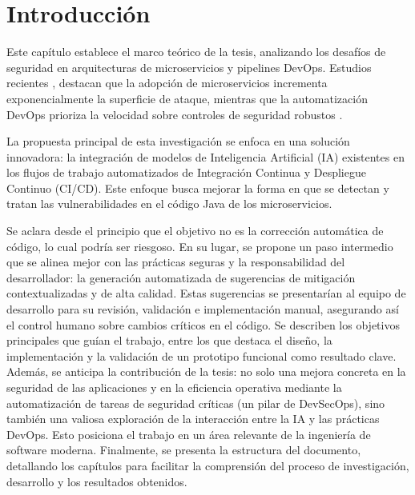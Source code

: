 \chapter{Introducción}\label{chap:introduccion}
Este capítulo establece el marco teórico de la tesis, analizando los desafíos de seguridad en arquitecturas de microservicios y pipelines DevOps. Estudios recientes \cite{1}, \cite{2} destacan que la adopción de microservicios incrementa exponencialmente la superficie de ataque, mientras que la automatización DevOps prioriza la velocidad sobre controles de seguridad robustos \cite{3}.

La propuesta principal de esta investigación se enfoca en una solución innovadora: la integración de modelos de Inteligencia Artificial (IA) existentes en los flujos de trabajo automatizados de Integración Continua y Despliegue Continuo (CI/CD). Este enfoque busca mejorar la forma en que se detectan y tratan las vulnerabilidades en el código Java de los microservicios.

Se aclara desde el principio que el objetivo no es la corrección automática de código, lo cual podría ser riesgoso. En su lugar, se propone un paso intermedio que se alinea mejor con las prácticas seguras y la responsabilidad del desarrollador: la generación automatizada de sugerencias de mitigación contextualizadas y de alta calidad. Estas sugerencias se presentarían al equipo de desarrollo para su revisión, validación e implementación manual, asegurando así el control humano sobre cambios críticos en el código. Se describen los objetivos principales que guían el trabajo, entre los que destaca el diseño, la implementación y la validación de un prototipo funcional como resultado clave. Además, se anticipa la contribución de la tesis: no solo una mejora concreta en la seguridad de las aplicaciones y en la eficiencia operativa mediante la automatización de tareas de seguridad críticas (un pilar de DevSecOps), sino también una valiosa exploración de la interacción entre la IA y las prácticas DevOps. Esto posiciona el trabajo en un área relevante de la ingeniería de software moderna. Finalmente, se presenta la estructura del documento, detallando los capítulos para facilitar la comprensión del proceso de investigación, desarrollo y los resultados obtenidos.

